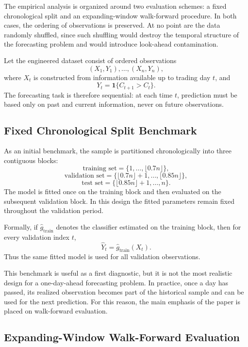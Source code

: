 \documentclass[11pt,a4paper]{article}
\begin{document}
	The empirical analysis is organized around two evaluation schemes: a fixed chronological split and an expanding-window walk-forward procedure. In both cases, the ordering of observations is preserved. At no point are the data randomly shuffled, since such shuffling would destroy the temporal structure of the forecasting problem and would introduce look-ahead contamination.
	
	Let the engineered dataset consist of ordered observations
	\[
	(X_1,Y_1),\dots,(X_n,Y_n),
	\]
	where \(X_t\) is constructed from information available up to trading day \(t\), and
	\[
	Y_t = \mathbf{1}\{C_{t+1} > C_t\}.
	\]
	The forecasting task is therefore sequential: at each time \(t\), prediction must be based only on past and current information, never on future observations.
	
	\subsection{Fixed Chronological Split Benchmark}
	
	As an initial benchmark, the sample is partitioned chronologically into three contiguous blocks:
	\[
	\text{training set} = \{1,\dots,\lfloor 0.7n \rfloor\},
	\]
	\[
	\text{validation set} = \{\lfloor 0.7n \rfloor + 1,\dots,\lfloor 0.85n \rfloor\},
	\]
	\[
	\text{test set} = \{\lfloor 0.85n \rfloor + 1,\dots,n\}.
	\]
	The model is fitted once on the training block and then evaluated on the subsequent validation block. In this design the fitted parameters remain fixed throughout the validation period.
	
	Formally, if \(\widehat{g}_{\mathrm{train}}\) denotes the classifier estimated on the training block, then for every validation index \(t\),
	\[
	\widehat{Y}_t = \widehat{g}_{\mathrm{train}}(X_t).
	\]
	Thus the same fitted model is used for all validation observations.
	
	This benchmark is useful as a first diagnostic, but it is not the most realistic design for a one-day-ahead forecasting problem. In practice, once a day has passed, its realized observation becomes part of the historical sample and can be used for the next prediction. For this reason, the main emphasis of the paper is placed on walk-forward evaluation.
	
	\subsection{Expanding-Window Walk-Forward Evaluation}
	
\end{document}
